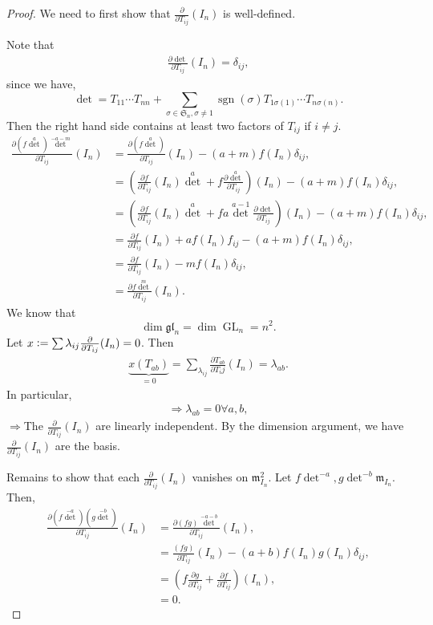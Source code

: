\documentclass[10pt]{article}
\numberwithin{equation}{theorem}
\DeclareMathOperator{\GL}{GL}
\DeclareMathOperator{\sgn}{sgn}
\newcommand{\defeq}{\vcentcolon=}
\newcommand{\m}[0]{\mathfrak{m}}
\newcommand{\gl}[0]{\mathfrak{gl}}
\begin{document}
\begin{proof}
  We need to first show that ${\frac {\partial} {\partial T_{ij}}}(I_n)$ is well-defined.
  \par Note that 
  \begin{align*}
    {\frac {\partial\det} {\partial T_{ij}}}(I_n) = \delta_{ij},
  \end{align*}
  since we have,
  \begin{equation*}
    \det = T_{11}\cdots T_{nn}+\sum_{\sigma\in\mathfrak{S}_n,\sigma\not=1}\sgn(\sigma)T_{1\sigma(1)}\cdots T_{n\sigma(n)}.
  \end{equation*}
  Then the right hand side contains at least two factors of $T_{ij}$ if $i\not=j$.
  \begin{align*}
    {\frac {\partial(f\det^a)\det^{-a-m}} {\partial T_{ij}}}(I_n) & = {\frac {\partial (f\det^a)} {\partial T_{ij}}}(I_n)-(a+m)f(I_n)\delta_{ij},\\
    & = \left({\frac {\partial f} {\partial T_{ij}}}(I_n)\det^a+f{\frac {\partial\det^a} {\partial T_{ij}}}\right)(I_n) - (a+m)f(I_n)\delta_{ij},\\
    & = \left({\frac {\partial f} {\partial T_{ij}}}(I_n)\det^a+fa\det^{a-1}{\frac {\partial\det} {\partial T_{ij}}}\right)(I_n)- (a+m)f(I_n)\delta_{ij},\\
    & = {\frac {\partial f} {\partial T_{ij}}}(I_n) + af(I_n)f_{ij}-(a+m)f(I_n)\delta_{ij},\\
    & = {\frac {\partial f}{\partial T_{ij}}}(I_n) - mf(I_n)\delta_{ij},\\
    & = {\frac {\partial f\det^m} {\partial T_{ij}}}(I_n).
  \end{align*}
  We know that 
  \begin{equation*}
    \dim\gl_n=\dim\GL_n=n^2.
  \end{equation*}
  Let $x\defeq\sum\lambda_{ij}{\frac {\partial }{\partial T_{ij}}}(I_n) = 0$. Then 
  \begin{align*}
    \underbrace{x(T_{ab})}_{=0}=\sum_{\lambda_{ij}}{{\frac {\partial T_{ab}}{\partial T_ij}}}(I_n) = \lambda_{ab}.
  \end{align*}
  In particular,
  \begin{align*}
    \Rightarrow\lambda_{ab} = 0\forall a,b,
  \end{align*}
  $\Rightarrow $The ${\frac {\partial} {\partial T_{ij}}}(I_n)$ are linearly independent. By the dimension argument, we have ${\frac {\partial} {\partial T_{ij}}}(I_n)$ are the basis.
  \par Remains to show that each ${\frac {\partial}{\partial T_{ij}}}(I_n)$ vanishes on $\m_{I_n}^2$. Let $f\det^{-a},g\det^{-b}\m_{I_n}$. Then,
  \begin{align*}
    {\frac {\partial(f\det^{-a})(g\det^{-b})} {\partial T_{ij}}}(I_n) & = {\frac {\partial (fg)\det^{-a-b}} {\partial T_{ij}}}(I_n),\\
    &= {\frac {(fg)} {\partial T_{ij}}}(I_n)-(a+b)f(I_n)g(I_n)\delta_{ij},\\
    & = \left(f{\frac {\partial g} {\partial T_{ij}}}+{\frac {\partial f} {\partial T_{ij}}}\right)(I_n),\\
    & = 0.
  \end{align*}
\end{proof}
\end{document}

